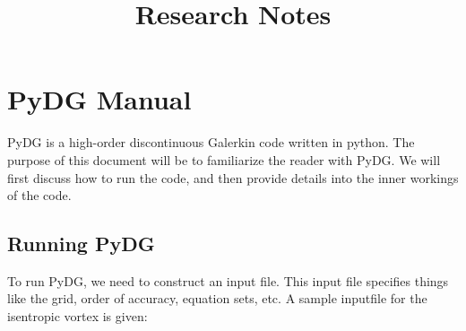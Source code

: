 \documentclass[times,12pt]{article}%
\title{Research Notes}
\begin{document}
\section{PyDG Manual}
PyDG is a high-order discontinuous Galerkin code written in python. The purpose of this document will be to familiarize the reader with PyDG. We will first discuss how to run the code, and then provide details into the inner workings of the code.

\subsection{Running PyDG}
To run PyDG, we need to construct an input file. This input file specifies things like the grid, order of accuracy, equation sets, etc.  A sample inputfile for the isentropic vortex is given:
\end{document}
